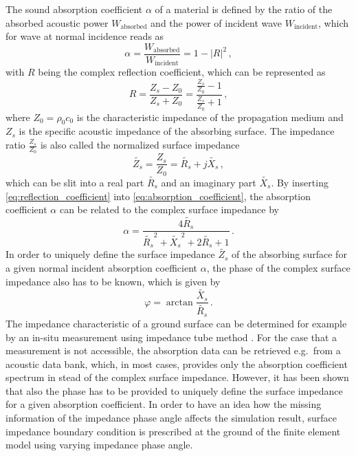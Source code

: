 The sound absorption coefficient $\alpha$ of a material is defined by the ratio of the absorbed acoustic power $W_{\text{absorbed}}$ and the power of incident wave $W_{\text{incident}}$, which for wave at normal incidence reads as
\begin{equation}
	\alpha = \frac{W_{\text{absorbed}}}{W_\text{incident}} = 1 - |R|^2\,, \label{eq:absorption_coefficient}
\end{equation}
with $R$ being the complex reflection coefficient, which can be represented as
\begin{equation}
	R = \frac{Z_s - Z_0}{Z_s + Z_0} = \frac{\frac{Z_s}{Z_0} - 1}{\frac{Z_s}{Z_0} + 1}\,, \label{eq:reflection_coefficient}
\end{equation}
where $Z_0 = \rho_0 c_0$ is the characteristic impedance of the propagation medium and $Z_s$ is the specific acoustic impedance of the absorbing surface.
The impedance ratio $\frac{Z_s}{Z_0}$ is also called the normalized surface impedance
\begin{equation}
	\tilde{Z_s} = \frac{Z_s}{Z_0} = \tilde{R_s} + j\tilde{X_s}\,,
\end{equation}
which can be slit into a real part $\tilde{R_s}$ and an imaginary part $\tilde{X_s}$. By inserting \cref{eq:reflection_coefficient} into \cref{eq:absorption_coefficient}, the absorption coefficient $\alpha$ can be related to the complex surface impedance by
\begin{equation}
	\alpha = \frac{4\tilde{R_s}}{\tilde{R_s}^2+\tilde{X_s}^2 + 2\tilde{R_s} + 1} \,. \label{eq:absorption_coefficient_2}
\end{equation}
In order to uniquely define the surface impedance $\tilde{Z_s}$ of the absorbing surface for a given normal incident absorption coefficient $\alpha$, the phase of the complex surface impedance also has to be known, which is given by
\begin{equation}
	 \varphi = \arctan{\frac{\tilde{X_s}}{\tilde{R_s}}}\,. \label{eq:impedance_phase_angle}
\end{equation}
The impedance characteristic of a ground surface can be determined for example by an in-situ measurement using impedance tube method \cite{wolkesson_2013,Seybert2008MeasurementOP}.
For the case that a measurement is not accessible, the absorption data can be retrieved e.g.\ from a acoustic data bank, which, in most cases, provides only the absorption coefficient spectrum in stead of the complex surface impedance.
However, it has been shown that also the phase has to be provided to uniquely define the surface impedance for a given absorption coefficient.
In order to have an idea how the missing information of the impedance phase angle affects the simulation result, surface impedance boundary condition is prescribed at the ground of the finite element model using varying impedance phase angle.

